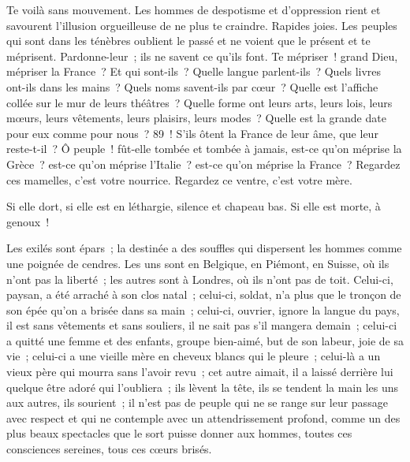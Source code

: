 \documentclass[french,twoside]{book} %
\begin{document}
Te voilà sans mouvement. Les hommes de despotisme et d’oppression rient et savourent l’illusion orgueilleuse de ne plus te craindre. Rapides joies. Les peuples qui sont dans les ténèbres oublient le passé et ne voient que le présent et te méprisent. Pardonne-leur ; ils ne savent ce qu’ils font. Te mépriser ! grand Dieu, mépriser la France ? Et qui sont-ils ? Quelle langue parlent-ils ? Quels livres ont-ils dans les mains ? Quels noms savent-ils par cœur ? Quelle est l’affiche collée sur le mur de leurs théâtres ? Quelle forme ont leurs arts, leurs lois, leurs mœurs, leurs vêtements, leurs plaisirs, leurs modes ? Quelle est la grande date pour eux comme pour nous ? 89 ! S’ils ôtent la France de leur âme, que leur reste-t-il ? Ô peuple ! fût-elle tombée et tombée à jamais, est-ce qu’on méprise la Grèce ? est-ce qu’on méprise l’Italie ? est-ce qu’on méprise la France ? Regardez ces mamelles, c’est votre nourrice. Regardez ce ventre, c’est votre mère.\par
Si elle dort, si elle est en léthargie, silence et chapeau bas. Si elle est morte, à genoux !\par
Les exilés sont épars ; la destinée a des souffles qui dispersent les hommes comme une poignée de cendres. Les uns sont en Belgique, en Piémont, en Suisse, où ils n’ont pas la liberté ; les autres sont à Londres, où ils n’ont pas de toit. Celui-ci, paysan, a été arraché à son clos natal ; celui-ci, soldat, n’a plus que le tronçon de son épée qu’on a brisée dans sa main ; celui-ci, ouvrier, ignore la langue du pays, il est sans vêtements et sans souliers, il ne sait pas s’il mangera demain ; celui-ci a quitté une femme et des enfants, groupe bien-aimé, but de son labeur, joie de sa vie ; celui-ci a une vieille mère en cheveux blancs qui le pleure ; celui-là a un vieux père qui mourra sans l’avoir revu ; cet autre aimait, il a laissé derrière lui quelque être adoré qui l’oubliera ; ils lèvent la tête, ils se tendent la main les uns aux autres, ils sourient ; il n’est pas de peuple qui ne se range sur leur passage avec respect et qui ne contemple avec un attendrissement profond, comme un des plus beaux spectacles que le sort puisse donner aux hommes, toutes ces consciences sereines, tous ces cœurs brisés.\par
\end{document}
